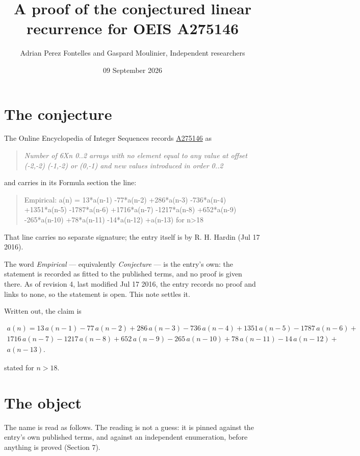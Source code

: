 \documentclass[11pt]{article}
\title{A proof of the conjectured linear recurrence for OEIS A275146}
\author{Adrian Perez Fontelles and Gaspard Moulinier, Independent researchers}
\date{09 September 2026}
\theoremstyle{definition}
\begin{document}
\maketitle
\section{The conjecture}

The Online Encyclopedia of Integer Sequences records \href{https://oeis.org/A275146}{A275146} as

\begin{quote}\itshape Number of 6Xn 0..2 arrays with no element equal to any value at offset (-2,-2) (-1,-2) or (0,-1) and new values introduced in order 0..2\end{quote}

and carries in its Formula section the line:

\begin{quote}\ttfamily Empirical: a(n) = 13*a(n-1) -77*a(n-2) +286*a(n-3) -736*a(n-4) +1351*a(n-5) -1787*a(n-6) +1716*a(n-7) -1217*a(n-8) +652*a(n-9) -265*a(n-10) +78*a(n-11) -14*a(n-12) +a(n-13) for n>18\end{quote}

That line carries no separate signature; the entry itself is by R. H. Hardin (Jul 17 2016).

The word {\itshape Empirical} --- equivalently {\itshape Conjecture} --- is the entry's own: the statement is recorded as fitted to the published terms, and no proof is given there. As of revision 4, last modified Jul 17 2016, the entry records no proof and links to none, so the statement is open. This note settles it.

Written out, the claim is

\begin{multline*} a(n) = 13\,a(n-1) - 77\,a(n-2) + 286\,a(n-3) - 736\,a(n-4) + 1351\,a(n-5) - 1787\,a(n-6) + \\ 1716\,a(n-7) - 1217\,a(n-8) + 652\,a(n-9) - 265\,a(n-10) + 78\,a(n-11) - 14\,a(n-12) + \\ a(n-13). \end{multline*}

stated for $n > 18$.

\section{The object}

The name is read as follows. The reading is not a guess: it is pinned against the entry's own published terms, and against an independent enumeration, before anything is proved (Section 7).
\end{document}
